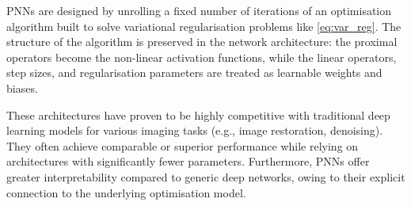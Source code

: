 PNNs are designed by unrolling a fixed number of iterations of an optimisation algorithm built to solve variational regularisation problems like \eqref{eq:var_reg}. The structure of the algorithm is preserved in the network architecture: the proximal operators become the non-linear activation functions, while the linear operators, step sizes, and regularisation parameters are treated as learnable weights and biases.

These architectures have proven to be highly competitive with traditional deep learning models for various imaging tasks (e.g., image restoration, denoising). They often achieve comparable or superior performance while relying on architectures with significantly fewer parameters. Furthermore, PNNs offer greater interpretability compared to generic deep networks, owing to their explicit connection to the underlying optimisation model.
